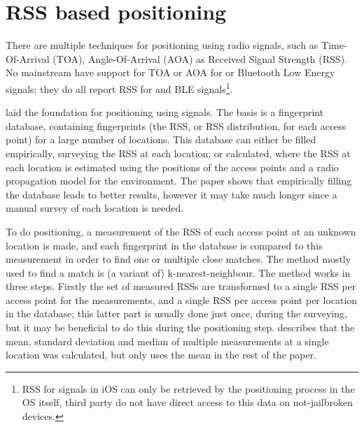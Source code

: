 \section{RSS based positioning}
\label{sec:architecture-rss-based-positioning}
There are multiple techniques for positioning using radio signals, such as Time-Of-Arrival (TOA), Angle-Of-Arrival (AOA) as Received Signal Strength (RSS).
No mainstream \devices have support for TOA or AOA for \wifi or Bluetooth Low Energy signals; they do all report RSS for \wifi and BLE signals\footnote{RSS for \wifi signals in iOS can only be retrieved by the positioning process in the OS itself, third party \apps do not have direct access to this data on not-jailbroken devices.}.

\citet{bahl2000radar} laid the foundation for positioning using \wifi signals.
The basis is a fingerprint database, containing fingerprints (the RSS, or RSS distribution, for each access point) for a large number of locations.
This database can either be filled empirically, surveying the RSS at each location; or calculated, where the RSS at each location is estimated using the positions of the access points and a radio propagation model for the environment.
The paper shows that empirically filling the database leads to better results, however it may take much longer since a manual survey of each location is needed.

To do positioning, a measurement of the RSS of each access point at an unknown location is made, and each fingerprint in the database is compared to this measurement in order to find one or multiple close matches.
The method mostly used to find a match is (a variant of) k-nearest-neighbour.
The method works in three steps.
Firstly the set of measured RSSs are transformed to a single RSS per access point for the measurements, and a single RSS per access point per location in the database; this latter part is usually done just once, during the surveying, but it may be beneficial to do this during the positioning step.
\citet{bahl2000radar} describes that the mean, standard deviation and median of multiple measurements at a single location was calculated, but only uses the mean in the rest of the paper.

